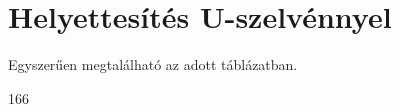 \section{Helyettesítés U-szelvénnyel}
Egyszerűen megtalálható az adott táblázatban.
\begin{center}\Large{166}\end{center}

